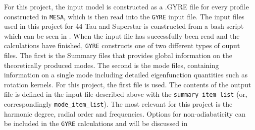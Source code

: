 For this project, the input model is constructed as a .GYRE file for every profile constructed in \texttt{MESA}, which is then read into the \texttt{GYRE} input file. The input files used in this project for 44 Tau and Superstar is constructed from a bash script which can be seen in . When the input file has successfully been read and the calculations have finished, \texttt{GYRE} constructs one of two different types of ouput files. The first is the Summary files that provides global information on the theoretically produced modes. The second is the mode files, containing information on a single mode including detailed eigenfunction quantities such as rotation kernels. For this project, the first file is used. The contents of the output file is defined in the input file described above with the \texttt{summary\_item\_list} (or, correspondingly \texttt{mode\_item\_list}). The most relevant for this project is the harmonic degree, radial order and frequencies. Options for non-adiabaticity can be included in the \texttt{GYRE} calculations and will be discussed in 

